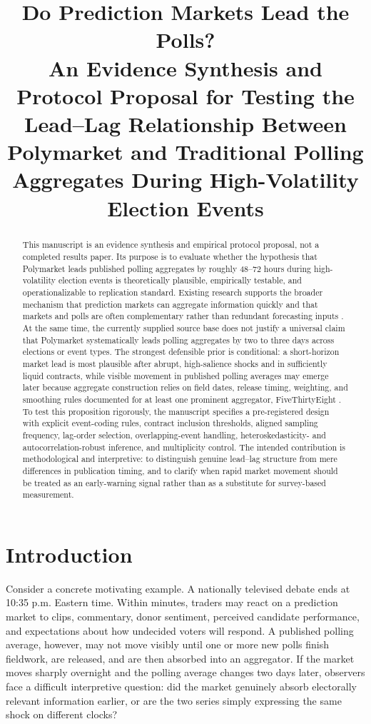 \documentclass[11pt]{article}
\title{Do Prediction Markets Lead the Polls?\\
An Evidence Synthesis and Protocol Proposal for Testing the Lead--Lag Relationship Between Polymarket and Traditional Polling Aggregates During High-Volatility Election Events}
\author{}
\date{}
\begin{document}
\maketitle

\begin{abstract}
This manuscript is an evidence synthesis and empirical protocol proposal, not a completed results paper. Its purpose is to evaluate whether the hypothesis that Polymarket leads published polling aggregates by roughly 48--72 hours during high-volatility election events is theoretically plausible, empirically testable, and operationalizable to replication standard. Existing research supports the broader mechanism that prediction markets can aggregate information quickly and that markets and polls are often complementary rather than redundant forecasting inputs \citep{predictionmarkets2004aeaweb, modelsmarketsandth2021arxiv}. At the same time, the currently supplied source base does not justify a universal claim that Polymarket systematically leads polling aggregates by two to three days across elections or event types. The strongest defensible prior is conditional: a short-horizon market lead is most plausible after abrupt, high-salience shocks and in sufficiently liquid contracts, while visible movement in published polling averages may emerge later because aggregate construction relies on field dates, release timing, weighting, and smoothing rules documented for at least one prominent aggregator, FiveThirtyEight \citep{howourpollingavera2023fivethir}. To test this proposition rigorously, the manuscript specifies a pre-registered design with explicit event-coding rules, contract inclusion thresholds, aligned sampling frequency, lag-order selection, overlapping-event handling, heteroskedasticity- and autocorrelation-robust inference, and multiplicity control. The intended contribution is methodological and interpretive: to distinguish genuine lead--lag structure from mere differences in publication timing, and to clarify when rapid market movement should be treated as an early-warning signal rather than as a substitute for survey-based measurement.
\end{abstract}

\section{Introduction}

Consider a concrete motivating example. A nationally televised debate ends at 10:35 p.m. Eastern time. Within minutes, traders may react on a prediction market to clips, commentary, donor sentiment, perceived candidate performance, and expectations about how undecided voters will respond. A published polling average, however, may not move visibly until one or more new polls finish fieldwork, are released, and are then absorbed into an aggregator. If the market moves sharply overnight and the polling average changes two days later, observers face a difficult interpretive question: did the market genuinely absorb electorally relevant information earlier, or are the two series simply expressing the same shock on different clocks?
\end{document}
